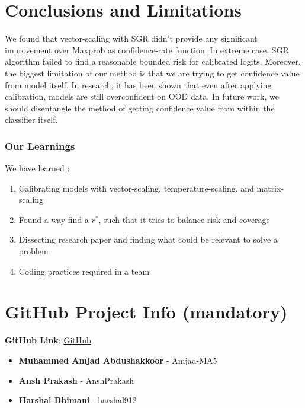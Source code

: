 \documentclass[
	english,
	accentcolor=8b,
	type=intern,
	marginpar=false
	]{tudapub}
\begin{document}
\newpage
\section{Conclusions and Limitations}
\label{sec:conclusion}
We found that vector-scaling with SGR didn't provide any significant improvement over Maxprob as confidence-rate function. 
In extreme case, SGR algorithm failed to find a reasonable bounded risk for calibrated logits.
Moreover, the biggest limitation of our method is that we are trying to get confidence value from model itself.
In research, it has been shown that even after applying calibration, models are still overconfident on OOD data.
In future work, we should disentangle the method of getting confidence value from within the classifier itself.


\subsubsection{Our Learnings}
We have learned :
\begin{enumerate}
    \item Calibrating models with vector-scaling, temperature-scaling, and matrix-scaling
    \item Found a way find a $r^*$, such that it tries to balance risk and coverage
    \item Dissecting research paper and finding what could be relevant to solve a problem
    \item Coding practices required in a team
\end{enumerate}






\appendix 

\section{GitHub Project Info {\color{red}(mandatory)}}
\textbf{GitHub Link}: \href{https://github.com/Amjad-MA5/Selective_Prediction_VQA}{GitHub} \par

\begin{itemize}
\item \textbf{Muhammed Amjad Abdushakkoor} - Amjad-MA5
\item \textbf{Ansh Prakash} - AnshPrakash
\item \textbf{Harshal Bhimani} - harshal912
\end{itemize}
\end{document}
